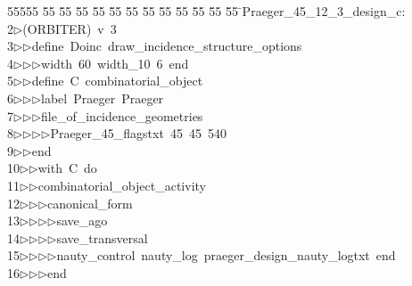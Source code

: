 %
%
\begin{tabbing}
55555 \= 55 \= 55 \= 55 \= 55 \= 55 \= 55 \= 55 \= 55 \= 55 \= 55 \= 55 \= 55 \= \>Praeger\_45\_12\_3\_design\_c:\\[0pt]
2\>$\triangleright$\>(ORBITER)\ v\ 3\ \\[0pt]
3\>$\triangleright$\>$\triangleright$\>define\ Doinc\ draw\_incidence\_structure\_options\ \\[0pt]
4\>$\triangleright$\>$\triangleright$\>$\triangleright$\>width\ 60\ width\_10\ 6\ end\ \\[0pt]
5\>$\triangleright$\>$\triangleright$\>define\ C\ combinatorial\_object\ \\[0pt]
6\>$\triangleright$\>$\triangleright$\>$\triangleright$\>label\ Praeger\ Praeger\ \\[0pt]
7\>$\triangleright$\>$\triangleright$\>$\triangleright$\>file\_of\_incidence\_geometries\ \\[0pt]
8\>$\triangleright$\>$\triangleright$\>$\triangleright$\>$\triangleright$\>Praeger\_45\_flagstxt\ 45\ 45\ 540\ \\[0pt]
9\>$\triangleright$\>$\triangleright$\>end\ \\[0pt]
10\>$\triangleright$\>$\triangleright$\>with\ C\ do\ \\[0pt]
11\>$\triangleright$\>$\triangleright$\>combinatorial\_object\_activity\ \\[0pt]
12\>$\triangleright$\>$\triangleright$\>$\triangleright$\>canonical\_form\ \\[0pt]
13\>$\triangleright$\>$\triangleright$\>$\triangleright$\>$\triangleright$\>save\_ago\ \\[0pt]
14\>$\triangleright$\>$\triangleright$\>$\triangleright$\>$\triangleright$\>save\_transversal\ \\[0pt]
15\>$\triangleright$\>$\triangleright$\>$\triangleright$\>$\triangleright$\>nauty\_control\ nauty\_log\ praeger\_design\_nauty\_logtxt\ end\ \\[0pt]
16\>$\triangleright$\>$\triangleright$\>$\triangleright$\>end\ \\[0pt]

\end{tabbing}
